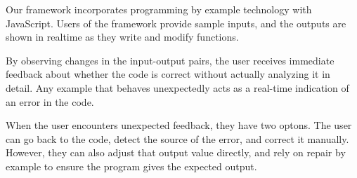 Our framework incorporates programming by example technology with
JavaScript.
Users of the framework provide sample inputs,
and the outputs are shown in realtime
as they write and modify functions.

By observing changes in the input-output pairs,
the user receives immediate feedback about whether the code is correct without actually analyzing it in detail.
Any example that behaves unexpectedly acts as a real-time indication of an error in the code. 

When the user encounters unexpected feedback, they have two optons.
The user can go back to the code, detect
the source of the error, and correct it manually.
However, they can also adjust that output value directly,
and rely on repair by example to ensure the program gives the expected output.





